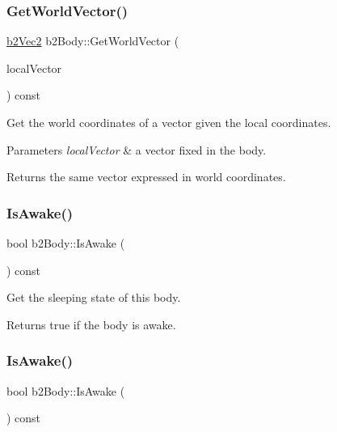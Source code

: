 \subsubsection{\texorpdfstring{Get\+World\+Vector()}{GetWorldVector()}\hspace{0.1cm}{\footnotesize\ttfamily [2/2]}}
{\footnotesize\ttfamily \hyperlink{structb2Vec2}{b2\+Vec2} b2\+Body\+::\+Get\+World\+Vector (\begin{DoxyParamCaption}\item[{const \hyperlink{structb2Vec2}{b2\+Vec2} \&}]{local\+Vector }\end{DoxyParamCaption}) const}

Get the world coordinates of a vector given the local coordinates. 
\begin{DoxyParams}{Parameters}
{\em local\+Vector} & a vector fixed in the body. \\
\hline
\end{DoxyParams}
\begin{DoxyReturn}{Returns}
the same vector expressed in world coordinates. 
\end{DoxyReturn}
\mbox{\label{classb2Body_a697f708427cdf7d31a626e80e694682c}} 
\subsubsection{\texorpdfstring{Is\+Awake()}{IsAwake()}\hspace{0.1cm}{\footnotesize\ttfamily [1/2]}}
{\footnotesize\ttfamily bool b2\+Body\+::\+Is\+Awake (\begin{DoxyParamCaption}{ }\end{DoxyParamCaption}) const\hspace{0.3cm}{\ttfamily [inline]}}

Get the sleeping state of this body. \begin{DoxyReturn}{Returns}
true if the body is awake. 
\end{DoxyReturn}
\mbox{\label{classb2Body_a697f708427cdf7d31a626e80e694682c}} 
\subsubsection{\texorpdfstring{Is\+Awake()}{IsAwake()}\hspace{0.1cm}{\footnotesize\ttfamily [2/2]}}
{\footnotesize\ttfamily bool b2\+Body\+::\+Is\+Awake (\begin{DoxyParamCaption}{ }\end{DoxyParamCaption}) const}

